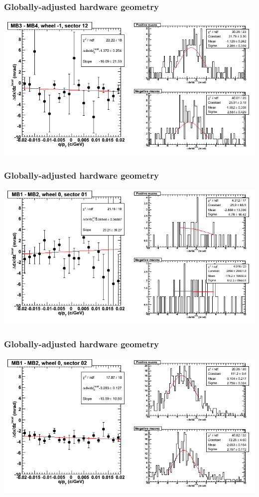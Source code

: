 \documentclass[compress]{beamer}
\begin{document}
\begin{frame}
\frametitle{Globally-adjusted hardware geometry}
\includegraphics[width=\linewidth]{NOV4_segdiffs_HW/dt13_slope_B_12_34.png}
\end{frame}

\begin{frame}
\frametitle{Globally-adjusted hardware geometry}
\includegraphics[width=\linewidth]{NOV4_segdiffs_HW/dt13_slope_C_01_12.png}
\end{frame}

\begin{frame}
\frametitle{Globally-adjusted hardware geometry}
\includegraphics[width=\linewidth]{NOV4_segdiffs_HW/dt13_slope_C_02_12.png}
\end{frame}
\end{document}
